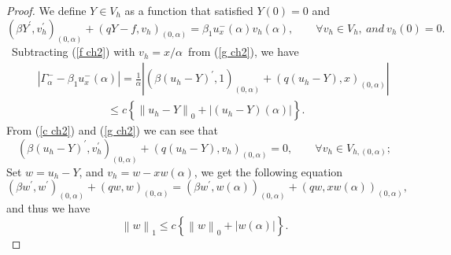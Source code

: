 \documentclass[11pt]{article}
\numberwithin{equation}{section}
\begin{document}
\begin{proof}
We define $Y \in V_{h}$ as a function that satisfied $Y(0)=0$ and
\begin{equation}\label{g ch2}
\left(\beta Y^{'} , v_{h}^{'}\right)_{\left(0,\alpha\right)}+\left(qY-f , v_{h}\right)_{\left(0,\alpha\right)}=\beta_{1}u_{x}^{-}\left(\alpha\right)v_{h}\left(\alpha\right) , \qquad  \forall v_{h}\in V_{h}, \ and ~v_{h}\left(0\right)=0.
\end{equation}
\ Subtracting (\ref{f ch2}) with $v_{h}=x/\alpha$~from (\ref{g ch2}), we have
\begin{eqnarray*}
&&\left|\Gamma_{\alpha}^{-}-\beta_{1}u_{x}^{-}\left(\alpha\right)\right|=\frac{1}{\alpha}\left|\left(\beta\left(u_{h}-Y\right)^{'}, 1 \right)_{\left(0,\alpha\right)}+\left(q\left(u_{h}-Y\right), x\right)_{\left(0,\alpha\right)}\right|\\
&&~~~\qquad\qquad\quad~~~\leq c\left\{\left\|u_{h}-Y\right\|_{0}+\left|\left(u_{h}-Y\right)\left(\alpha\right)\right|\right\}.
\end{eqnarray*}
From (\ref{c ch2}) and (\ref{g ch2}) we can see that
\begin{equation}\label{}
\left(\beta \left(u_{h}-Y\right)^{'} , v_{h}^{'}\right)_{\left(0,\alpha\right)}+\left(q\left(u_{h}-Y\right) , v_{h} \right)_{\left(0,\alpha\right)}=0 , \qquad \forall v_{h} \in V_{h,\left(0,\alpha\right)};
\end{equation}
Set $w=u_{h}-Y$, and $v_{h}=w-xw(\alpha)$, we get the following equation
\begin{equation*}\label{}
\left(\beta w^{'} , w^{'}\right)_{\left(0,\alpha\right)}+\left(qw , w\right)_{\left(0,\alpha\right)}=\left(\beta w^{'} , w\left(\alpha\right)\right)_{\left(0,\alpha\right)}+\left(qw , xw\left(\alpha\right)\right)_{\left(0,\alpha\right)},
\end{equation*}
and thus we have
\begin{equation}\label{h ch2}
\left\|w\right\|_{1}\leq c\left\{\left\|w\right\|_{0}+\left|w\left(\alpha\right)\right|\right\}.
\end{equation}


\end{proof}
\end{document}
